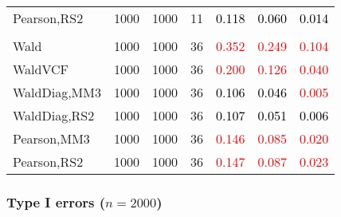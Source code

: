 \documentclass[
]{article}
\begin{document}
\begin{table}[H]
{\begin{tabular}[t]{lrrrrrr}
\hspace{1em}Pearson,RS2 & 1000 & 1000 & 11 & \textcolor{black}{0.118} & \textcolor{black}{0.060} & \textcolor{black}{0.014}\\
\addlinespace[0.3em]
\multicolumn{7}{l}{\textbf{3F 15V}}\\
\hspace{1em}Wald & 1000 & 1000 & 36 & \textcolor{red}{0.352} & \textcolor{red}{0.249} & \textcolor{red}{0.104}\\
\hspace{1em}WaldVCF & 1000 & 1000 & 36 & \textcolor{red}{0.200} & \textcolor{red}{0.126} & \textcolor{red}{0.040}\\
\hspace{1em}WaldDiag,MM3 & 1000 & 1000 & 36 & \textcolor{black}{0.106} & \textcolor{black}{0.046} & \textcolor{red}{0.005}\\
\hspace{1em}WaldDiag,RS2 & 1000 & 1000 & 36 & \textcolor{black}{0.107} & \textcolor{black}{0.051} & \textcolor{black}{0.006}\\
\hspace{1em}Pearson,MM3 & 1000 & 1000 & 36 & \textcolor{red}{0.146} & \textcolor{red}{0.085} & \textcolor{red}{0.020}\\
\hspace{1em}Pearson,RS2 & 1000 & 1000 & 36 & \textcolor{red}{0.147} & \textcolor{red}{0.087} & \textcolor{red}{0.023}\\
\bottomrule
\end{tabular}}
\endgroup{}
\end{table}

\hypertarget{type-i-errors-n2000-3}{%
\subsubsection{\texorpdfstring{Type I errors
(\(n=2000\))}{Type I errors (n=2000)}}\label{type-i-errors-n2000-3}}
\end{document}
